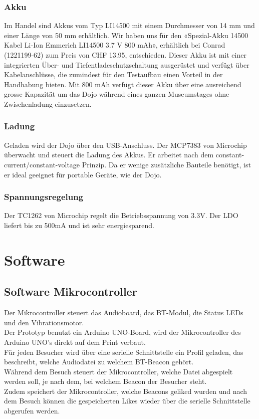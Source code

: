 \subsubsection{Akku}
Im Handel sind Akkus vom Typ LI14500 mit einem Durchmesser von 14 mm und einer Länge von 50 mm erhältlich. Wir haben uns für den «Spezial-Akku 14500 Kabel Li-Ion Emmerich LI14500 3.7 V 800 mAh», erhältlich bei Conrad (1221199-62) zum Preis von CHF 13.95, entschieden. Dieser Akku ist mit einer integrierten Über- und Tiefentladeschutzschaltung ausgerüstet und verfügt über Kabelanschlüsse, die zumindest für den Testaufbau einen Vorteil in der Handhabung bieten. Mit 800 mAh verfügt dieser Akku über eine ausreichend grosse Kapazität um das Dojo während eines ganzen Museumstages ohne Zwischenladung einzusetzen.
\subsubsection{Ladung}
Geladen wird der Dojo über den USB-Anschluss. Der MCP7383 von Microchip  überwacht und steuert die Ladung des Akkus. Er arbeitet nach dem constant-current/constant-voltage Prinzip. Da er wenige zusätzliche Bauteile benötigt, ist er ideal geeignet für portable Geräte, wie der Dojo.
\subsubsection{Spannungsregelung}
Der TC1262 von Microchip regelt die Betriebsspannung von 3.3V. Der LDO liefert bis zu 500mA und ist sehr energiesparend.
\section{Software}
\subsection{Software Mikrocontroller}
Der Mikrocontroller steuert das Audioboard, das BT-Modul, die Status LEDs und den Vibrationsmotor.\\[0.5cm]
Der Prototyp benutzt ein Arduino UNO-Board, wird der Mikrocontroller des Arduino UNO's direkt auf dem Print verbaut.
\\[0.5cm]
Für jeden Besucher wird über eine serielle Schnittstelle ein Profil geladen, das beschreibt, welche Audiodatei zu welchem BT-Beacon gehört. \\
Während dem Besuch steuert der Mikrocontroller, welche Datei abgespielt werden soll, je nach dem, bei welchem Beacon der Besucher steht.\\
Zudem speichert der Mikrocontroller, welche Beacons geliked wurden und nach dem Besuch können die gespeicherten Likes wieder über die serielle Schnittstelle abgerufen werden.\\
\newpage
